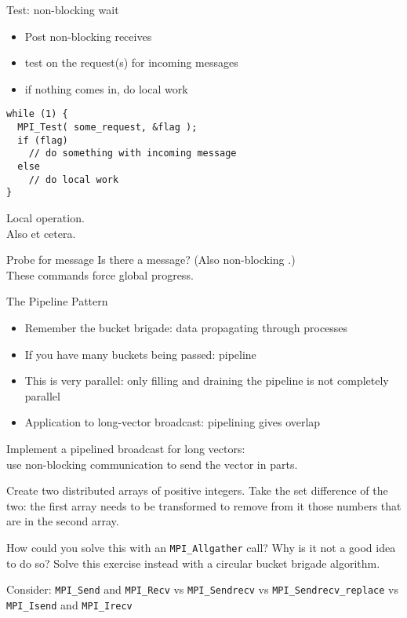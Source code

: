 \begin{numberedframe}{Test: non-blocking wait}
  \begin{itemize}
  \item Post non-blocking receives
  \item test on the request(s) for incoming messages
  \item if nothing comes in, do local work
  \end{itemize}
\lstset{language=C}
\begin{lstlisting}
while (1) {
  MPI_Test( some_request, &flag );
  if (flag)
    // do something with incoming message
  else
    // do local work
}
\end{lstlisting}
Local operation.\\
Also  et cetera.
\end{numberedframe}

\begin{numberedframe}{Probe for message}
  Is there a message?
  (Also non-blocking .)\\
  These commands force global progress.
\end{numberedframe}

\begin{numberedframe}{The Pipeline Pattern}
  \begin{itemize}
  \item Remember the bucket brigade: data propagating through
    processes
  \item If you have many buckets being passed: pipeline
  \item This is very parallel: only filling and draining the pipeline
    is not completely parallel
  \item Application to long-vector broadcast: pipelining gives overlap
  \end{itemize}
\end{numberedframe}

\begin{optexerciseframe}[bucketpipenonblock]
  Implement a pipelined broadcast for long vectors:\\
  use non-blocking communication to send the vector in parts.
\end{optexerciseframe}

\begin{exerciseframe}[setdiff]
  Create two distributed arrays of positive integers.
  Take the set difference of the two:
  the first array needs to be transformed to remove from it those numbers
  that are in the second array.

  How could you solve this with an \lstinline+MPI_Allgather+ call?
  Why is it not a good idea to do so?
  Solve this exercise instead with a circular bucket brigade algorithm.

  Consider: \lstinline{MPI_Send} and \lstinline{MPI_Recv} vs
  \lstinline{MPI_Sendrecv} vs \lstinline{MPI_Sendrecv_replace} vs
  \lstinline{MPI_Isend} and \lstinline{MPI_Irecv}
\end{exerciseframe}

